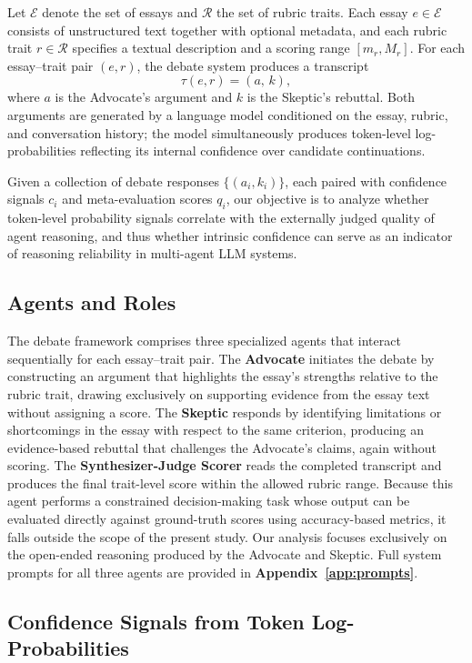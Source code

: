 \documentclass[11pt]{article}
\begin{document}
Let $\mathcal{E}$ denote the set of essays and $\mathcal{R}$ the set of rubric traits. Each essay $e \in \mathcal{E}$ consists of unstructured text together with optional metadata, and each rubric trait $r \in \mathcal{R}$ specifies a textual description and a scoring range $[m_r, M_r]$. For each essay–trait pair $(e, r)$, the debate system produces a transcript
\[
\tau(e,r) = (a,\, k),
\]
where $a$ is the Advocate's argument and $k$ is the Skeptic's rebuttal. Both arguments are generated by a language model conditioned on the essay, rubric, and conversation history; the model simultaneously produces token-level log-probabilities reflecting its internal confidence over candidate continuations.

Given a collection of debate responses $\{(a_i, k_i)\}$, each paired with confidence signals $c_i$ and meta-evaluation scores $q_i$, our objective is to analyze whether token-level probability signals correlate with the externally judged quality of agent reasoning, and thus whether intrinsic confidence can serve as an indicator of reasoning reliability in multi-agent LLM systems.

\subsection{Agents and Roles}

The debate framework comprises three specialized agents that interact sequentially for each essay–trait pair. The \textbf{Advocate} initiates the debate by constructing an argument that highlights the essay's strengths relative to the rubric trait, drawing exclusively on supporting evidence from the essay text without assigning a score. The \textbf{Skeptic} responds by identifying limitations or shortcomings in the essay with respect to the same criterion, producing an evidence-based rebuttal that challenges the Advocate's claims, again without scoring. The \textbf{Synthesizer-Judge Scorer} reads the completed transcript and produces the final trait-level score within the allowed rubric range. Because this agent performs a constrained decision-making task whose output can be evaluated directly against ground-truth scores using accuracy-based metrics, it falls outside the scope of the present study. Our analysis focuses exclusively on the open-ended reasoning produced by the Advocate and Skeptic. Full system prompts for all three agents are provided in \textbf{Appendix~\ref{app:prompts}}.


\subsection{Confidence Signals from Token Log-Probabilities}
\end{document}
